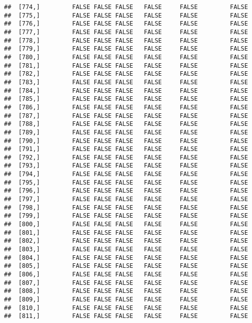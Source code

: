 \documentclass[
]{article}
\begin{document}
\begin{verbatim}
##  [774,]         FALSE FALSE FALSE   FALSE     FALSE         FALSE
##  [775,]         FALSE FALSE FALSE   FALSE     FALSE         FALSE
##  [776,]         FALSE FALSE FALSE   FALSE     FALSE         FALSE
##  [777,]         FALSE FALSE FALSE   FALSE     FALSE         FALSE
##  [778,]         FALSE FALSE FALSE   FALSE     FALSE         FALSE
##  [779,]         FALSE FALSE FALSE   FALSE     FALSE         FALSE
##  [780,]         FALSE FALSE FALSE   FALSE     FALSE         FALSE
##  [781,]         FALSE FALSE FALSE   FALSE     FALSE         FALSE
##  [782,]         FALSE FALSE FALSE   FALSE     FALSE         FALSE
##  [783,]         FALSE FALSE FALSE   FALSE     FALSE         FALSE
##  [784,]         FALSE FALSE FALSE   FALSE     FALSE         FALSE
##  [785,]         FALSE FALSE FALSE   FALSE     FALSE         FALSE
##  [786,]         FALSE FALSE FALSE   FALSE     FALSE         FALSE
##  [787,]         FALSE FALSE FALSE   FALSE     FALSE         FALSE
##  [788,]         FALSE FALSE FALSE   FALSE     FALSE         FALSE
##  [789,]         FALSE FALSE FALSE   FALSE     FALSE         FALSE
##  [790,]         FALSE FALSE FALSE   FALSE     FALSE         FALSE
##  [791,]         FALSE FALSE FALSE   FALSE     FALSE         FALSE
##  [792,]         FALSE FALSE FALSE   FALSE     FALSE         FALSE
##  [793,]         FALSE FALSE FALSE   FALSE     FALSE         FALSE
##  [794,]         FALSE FALSE FALSE   FALSE     FALSE         FALSE
##  [795,]         FALSE FALSE FALSE   FALSE     FALSE         FALSE
##  [796,]         FALSE FALSE FALSE   FALSE     FALSE         FALSE
##  [797,]         FALSE FALSE FALSE   FALSE     FALSE         FALSE
##  [798,]         FALSE FALSE FALSE   FALSE     FALSE         FALSE
##  [799,]         FALSE FALSE FALSE   FALSE     FALSE         FALSE
##  [800,]         FALSE FALSE FALSE   FALSE     FALSE         FALSE
##  [801,]         FALSE FALSE FALSE   FALSE     FALSE         FALSE
##  [802,]         FALSE FALSE FALSE   FALSE     FALSE         FALSE
##  [803,]         FALSE FALSE FALSE   FALSE     FALSE         FALSE
##  [804,]         FALSE FALSE FALSE   FALSE     FALSE         FALSE
##  [805,]         FALSE FALSE FALSE   FALSE     FALSE         FALSE
##  [806,]         FALSE FALSE FALSE   FALSE     FALSE         FALSE
##  [807,]         FALSE FALSE FALSE   FALSE     FALSE         FALSE
##  [808,]         FALSE FALSE FALSE   FALSE     FALSE         FALSE
##  [809,]         FALSE FALSE FALSE   FALSE     FALSE         FALSE
##  [810,]         FALSE FALSE FALSE   FALSE     FALSE         FALSE
##  [811,]         FALSE FALSE FALSE   FALSE     FALSE         FALSE

\end{verbatim}
\end{document}
